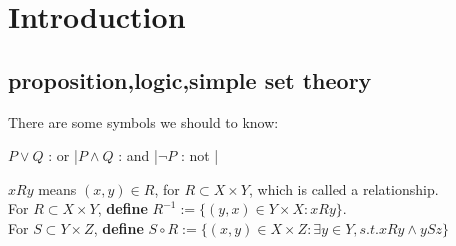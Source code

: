\section{Introduction}
\subsection{proposition,logic,simple set theory}
There are some symbols we should to know:
\begin{center}
    $ P\vee Q $ : or \quad |\quad $ P\wedge Q $ : and \quad |\quad $ \lnot P $ : not \quad|
\end{center}
$ xRy $ means  $ (x,y)\in R $, for  $ R\subset X\times Y $, which is called a relationship.\\   
For  $ R\subset X\times Y $, \textbf{define} $ R ^{-1}:=\{(y,x)\in Y\times X:xRy\} $.\\
For  $ S\subset Y\times Z $, \textbf{define}  $ S\circ  R :=\{(x,y)\in X\times Z:\exists y\in Y,s.t. xRy \land ySz\}$    \\

